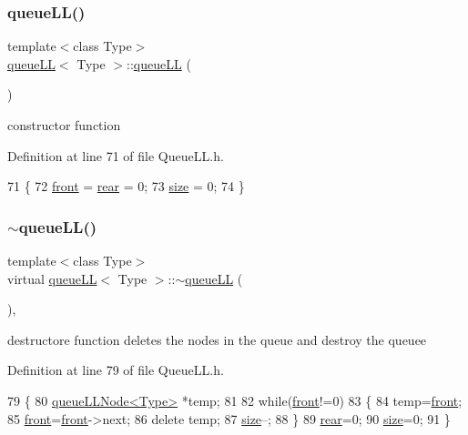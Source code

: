 \subsubsection{\texorpdfstring{queue\+L\+L()}{queueLL()}}
{\footnotesize\ttfamily template$<$class Type$>$ \\
\hyperlink{classqueue_l_l}{queue\+LL}$<$ Type $>$\+::\hyperlink{classqueue_l_l}{queue\+LL} (\begin{DoxyParamCaption}{ }\end{DoxyParamCaption})\hspace{0.3cm}{\ttfamily [inline]}}

constructor function 

Definition at line 71 of file Queue\+L\+L.\+h.


\begin{DoxyCode}
71              \{
72         \hyperlink{classqueue_l_l_a622ea439d113fe8e4616320ec2346d8b}{front} = \hyperlink{classqueue_l_l_aab0540567095f05fb1c981a2e7e4e93e}{rear} = 0;
73         \hyperlink{classqueue_l_l_af2ae538d6971624f1c8404d3a8502aa0}{size} = 0;
74     \}
\end{DoxyCode}
\mbox{\label{classqueue_l_l_af1560879b08f475cccfca106e0320cf6}} 
\subsubsection{\texorpdfstring{$\sim$queue\+L\+L()}{~queueLL()}}
{\footnotesize\ttfamily template$<$class Type$>$ \\
virtual \hyperlink{classqueue_l_l}{queue\+LL}$<$ Type $>$\+::$\sim$\hyperlink{classqueue_l_l}{queue\+LL} (\begin{DoxyParamCaption}{ }\end{DoxyParamCaption})\hspace{0.3cm}{\ttfamily [inline]}, {\ttfamily [virtual]}}

destructore function deletes the nodes in the queue and destroy the queuee 

Definition at line 79 of file Queue\+L\+L.\+h.


\begin{DoxyCode}
79                       \{
80         \hyperlink{classqueue_l_l_node}{queueLLNode<Type>} *temp;
81 
82         \textcolor{keywordflow}{while}(\hyperlink{classqueue_l_l_a622ea439d113fe8e4616320ec2346d8b}{front}!=0)
83         \{
84             temp=\hyperlink{classqueue_l_l_a622ea439d113fe8e4616320ec2346d8b}{front};
85             \hyperlink{classqueue_l_l_a622ea439d113fe8e4616320ec2346d8b}{front}=\hyperlink{classqueue_l_l_a622ea439d113fe8e4616320ec2346d8b}{front}->next;
86             \textcolor{keyword}{delete} temp;
87             \hyperlink{classqueue_l_l_af2ae538d6971624f1c8404d3a8502aa0}{size}--;
88         \}
89         \hyperlink{classqueue_l_l_aab0540567095f05fb1c981a2e7e4e93e}{rear}=0;
90         \hyperlink{classqueue_l_l_af2ae538d6971624f1c8404d3a8502aa0}{size}=0;
91     \}
\end{DoxyCode}


